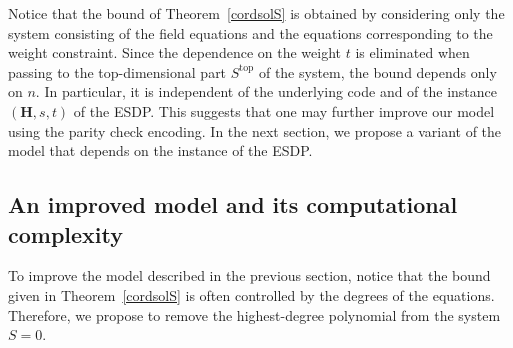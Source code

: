 \documentclass[11pt]{article}
\newcommand{\es}[2]{e_{#1,\, #2}}
\theoremstyle{plain}
\theoremstyle{definition}
\theoremstyle{remark}
\begin{document}

Notice that the bound of Theorem~\ref{cordsolS} is obtained by considering only the system consisting of the field equations and the equations corresponding to the weight constraint. Since the dependence on the weight $t$ is eliminated when passing to the top-dimensional part $S^{\operatorname{top}}$ of the system, the bound depends only on $n$. In particular, it is independent of the underlying code and of the instance $(\mathbf{H},s,t)$ of the ESDP. This suggests that one may further improve our model using the parity check encoding. In the next section, we propose a variant of the model that depends on the instance of the ESDP.

\subsection{An improved model and its computational complexity}\label{secComplexityESDP}

To improve the model described in the previous section, notice that the bound given in Theorem~\ref{cordsolS} is often controlled by the degrees of the equations. 
Therefore, we propose to remove the highest-degree polynomial from the system $S=0$. 
\end{document}

